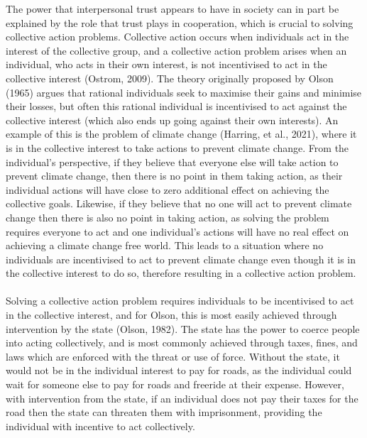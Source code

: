 \documentclass[
  11pt,
]{article}
\begin{document}
The power that interpersonal trust appears to have in society can in part be explained by the role that trust plays in cooperation, which is crucial to solving collective action problems. Collective action occurs when individuals act in the interest of the collective group, and a collective action problem arises when an individual, who acts in their own interest, is not incentivised to act in the collective interest (Ostrom, 2009). The theory originally proposed by Olson (1965) argues that rational individuals seek to maximise their gains and minimise their losses, but often this rational individual is incentivised to act against the collective interest (which also ends up going against their own interests). An example of this is the problem of climate change (Harring, et al., 2021), where it is in the collective interest to take actions to prevent climate change. From the individual's perspective, if they believe that everyone else will take action to prevent climate change, then there is no point in them taking action, as their individual actions will have close to zero additional effect on achieving the collective goals. Likewise, if they believe that no one will act to prevent climate change then there is also no point in taking action, as solving the problem requires everyone to act and one individual's actions will have no real effect on achieving a climate change free world. This leads to a situation where no individuals are incentivised to act to prevent climate change even though it is in the collective interest to do so, therefore resulting in a collective action problem.\\
~\\
Solving a collective action problem requires individuals to be incentivised to act in the collective interest, and for Olson, this is most easily achieved through intervention by the state (Olson, 1982). The state has the power to coerce people into acting collectively, and is most commonly achieved through taxes, fines, and laws which are enforced with the threat or use of force. Without the state, it would not be in the individual interest to pay for roads, as the individual could wait for someone else to pay for roads and freeride at their expense. However, with intervention from the state, if an individual does not pay their taxes for the road then the state can threaten them with imprisonment, providing the individual with incentive to act collectively.\\
~\\
\end{document}
